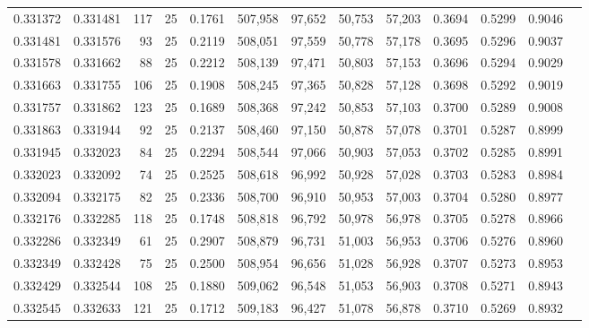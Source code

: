 \begin{tabular}{rrrrrrrrrrrrr}
0.331372 & 0.331481 &   117 &  25 &                                     0.1761 & 507,958 &  97,652 &  50,753 &  57,203 & 0.3694 & 0.5299 & 0.9046 \\
0.331481 & 0.331576 &    93 &  25 &                                     0.2119 & 508,051 &  97,559 &  50,778 &  57,178 & 0.3695 & 0.5296 & 0.9037 \\
0.331578 & 0.331662 &    88 &  25 &                                     0.2212 & 508,139 &  97,471 &  50,803 &  57,153 & 0.3696 & 0.5294 & 0.9029 \\
0.331663 & 0.331755 &   106 &  25 &                                     0.1908 & 508,245 &  97,365 &  50,828 &  57,128 & 0.3698 & 0.5292 & 0.9019 \\
0.331757 & 0.331862 &   123 &  25 &                                     0.1689 & 508,368 &  97,242 &  50,853 &  57,103 & 0.3700 & 0.5289 & 0.9008 \\
0.331863 & 0.331944 &    92 &  25 &                                     0.2137 & 508,460 &  97,150 &  50,878 &  57,078 & 0.3701 & 0.5287 & 0.8999 \\
0.331945 & 0.332023 &    84 &  25 &                                     0.2294 & 508,544 &  97,066 &  50,903 &  57,053 & 0.3702 & 0.5285 & 0.8991 \\
0.332023 & 0.332092 &    74 &  25 &                                     0.2525 & 508,618 &  96,992 &  50,928 &  57,028 & 0.3703 & 0.5283 & 0.8984 \\
0.332094 & 0.332175 &    82 &  25 &                                     0.2336 & 508,700 &  96,910 &  50,953 &  57,003 & 0.3704 & 0.5280 & 0.8977 \\
0.332176 & 0.332285 &   118 &  25 &                                     0.1748 & 508,818 &  96,792 &  50,978 &  56,978 & 0.3705 & 0.5278 & 0.8966 \\
0.332286 & 0.332349 &    61 &  25 &                                     0.2907 & 508,879 &  96,731 &  51,003 &  56,953 & 0.3706 & 0.5276 & 0.8960 \\
0.332349 & 0.332428 &    75 &  25 &                                     0.2500 & 508,954 &  96,656 &  51,028 &  56,928 & 0.3707 & 0.5273 & 0.8953 \\
0.332429 & 0.332544 &   108 &  25 &                                     0.1880 & 509,062 &  96,548 &  51,053 &  56,903 & 0.3708 & 0.5271 & 0.8943 \\
0.332545 & 0.332633 &   121 &  25 &                                     0.1712 & 509,183 &  96,427 &  51,078 &  56,878 & 0.3710 & 0.5269 & 0.8932 \\

\end{tabular}
